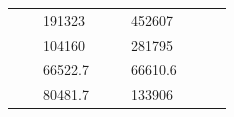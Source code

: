 \begin{table}[]
\begin{tabular}{|cclccllll}
\multicolumn{1}{|c|}{\cellcolor[HTML]{FFFFC7}}                                & \multicolumn{1}{c|}{\cellcolor[HTML]{DDFDFF}}                      & \multicolumn{1}{l|}{\cellcolor[HTML]{DAE8FC}191323}    & \multicolumn{1}{c|}{\cellcolor[HTML]{FFFFC7}}                                & \multicolumn{1}{c|}{\cellcolor[HTML]{DDFDFF}}                       & \multicolumn{1}{l|}{\cellcolor[HTML]{DDFDFF}452607}    &                                                                              &                                                                    &                                                        \\ \cline{3-3} \cline{6-6}
\multicolumn{1}{|c|}{\cellcolor[HTML]{FFFFC7}}                                & \multicolumn{1}{c|}{\cellcolor[HTML]{DDFDFF}}                      & \multicolumn{1}{l|}{\cellcolor[HTML]{DDFDFF}104160}    & \multicolumn{1}{c|}{\cellcolor[HTML]{FFFFC7}}                                & \multicolumn{1}{c|}{\cellcolor[HTML]{DDFDFF}}                       & \multicolumn{1}{l|}{\cellcolor[HTML]{DAE8FC}281795}    &                                                                              &                                                                    &                                                        \\ \cline{3-3} \cline{6-6}
\multicolumn{1}{|c|}{\cellcolor[HTML]{FFFFC7}}                                & \multicolumn{1}{c|}{\cellcolor[HTML]{DDFDFF}}                      & \multicolumn{1}{l|}{\cellcolor[HTML]{DAE8FC}66522.7}   & \multicolumn{1}{c|}{\cellcolor[HTML]{FFFFC7}}                                & \multicolumn{1}{c|}{\cellcolor[HTML]{DDFDFF}}                       & \multicolumn{1}{l|}{\cellcolor[HTML]{DDFDFF}66610.6}   &                                                                              &                                                                    &                                                        \\ \cline{3-3} \cline{6-6}
\multicolumn{1}{|c|}{\cellcolor[HTML]{FFFFC7}}                                & \multicolumn{1}{c|}{\cellcolor[HTML]{DDFDFF}}                      & \multicolumn{1}{l|}{\cellcolor[HTML]{DDFDFF}80481.7}   & \multicolumn{1}{c|}{\cellcolor[HTML]{FFFFC7}}                                & \multicolumn{1}{c|}{\cellcolor[HTML]{DDFDFF}}                       & \multicolumn{1}{l|}{\cellcolor[HTML]{DAE8FC}133906}    &                                                                              &                                                                    &                                                        \\ \cline{3-3} \cline{6-6}

\end{tabular}
\end{table}
